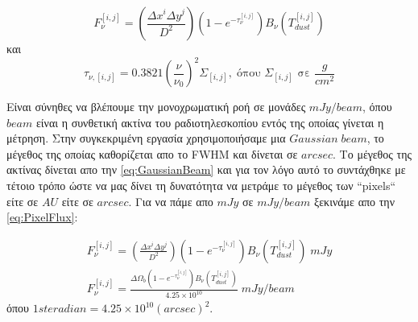 \begin{equation}\label{eq:PixelFlux}
  F_{\nu}^{[i,j]} = (\frac{\Delta x^i \Delta y^j}{D^2})(1-e^{-\tau_{\nu}^{[i,j]}})B_{\nu}(Τ_{dust}^{[i,j]})
\end{equation}
και
\begin{equation}\label{eq:OpticalDepth4}
  \tau_{\nu,[i,j]} = 0.3821 (\frac{\nu}{\nu_0})^{2} \Sigma_{[i,j]},\; \text{όπου $\Sigma_{[i,j]}$ σε $\frac{g}{cm^{2}}$}
\end{equation}

Είναι σύνηθες να βλέπουμε την μονοχρωματική ροή σε μονάδες  $mJy/beam$, όπου $beam$ είναι η συνθετική ακτίνα του ραδιοτηλεσκοπίου εντός της οποίας γίνεται η μέτρηση. Στην συγκεκριμένη εργασία χρησιμοποιήσαμε μια $Gaussian \; beam$, το μέγεθος της οποίας καθορίζεται απο το {\en FWHM} και δίνεται σε $arcsec$. Το μέγεθος της ακτίνας δίνεται απο την \eqref{eq:GaussianBeam} και για τον λόγο αυτό το {} συντάχθηκε με τέτοιο τρόπο ώστε να μας δίνει τη δυνατότητα να μετράμε το μέγεθος των {\en ``pixels``} είτε σε $AU$ είτε σε $arcsec$. Για να πάμε απο $mJy$ σε $mJy/beam$ ξεκινάμε απο την \eqref{eq:PixelFlux}:

\begin{align}
 F_{\nu}^{[i,j]} = (\frac{\Delta x^i \Delta y^j}{D^2})(1-e^{-\tau_{\nu}^{[i,j]}})B_{\nu}(Τ_{dust}^{[i,j]}) \; \text{$mJy$}\\
 F_{\nu}^{[i,j]} = \frac{\Delta\Omega_b(1-e^{-\tau_{\nu}^{[i,j]}})B_{\nu}(Τ_{dust}^{[i,j]})}{ 4.25\times10^{10}} \; \text{$mJy/beam$}
\end{align}\label{eq:PixelFluxBeam}
όπου $1 steradian = 4.25\times10^{10} (arcsec)^2$.

